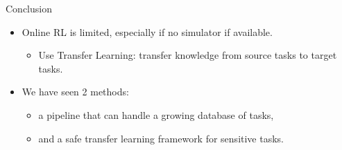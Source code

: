 \documentclass{beamer}
\begin{document}
    \begin{frame}{Conclusion}
        \begin{itemize}
            \item Online RL is limited, especially if no simulator if available.
            \begin{itemize}
                \item Use Transfer Learning: transfer knowledge from source tasks to target tasks.
            \end{itemize}
            \item We have seen 2 methods:
            \begin{itemize}
                \item a pipeline that can handle a growing database of tasks,
                \item and a safe transfer learning framework for sensitive tasks.
            \end{itemize}
        \end{itemize}

    \end{frame}
\end{document}

